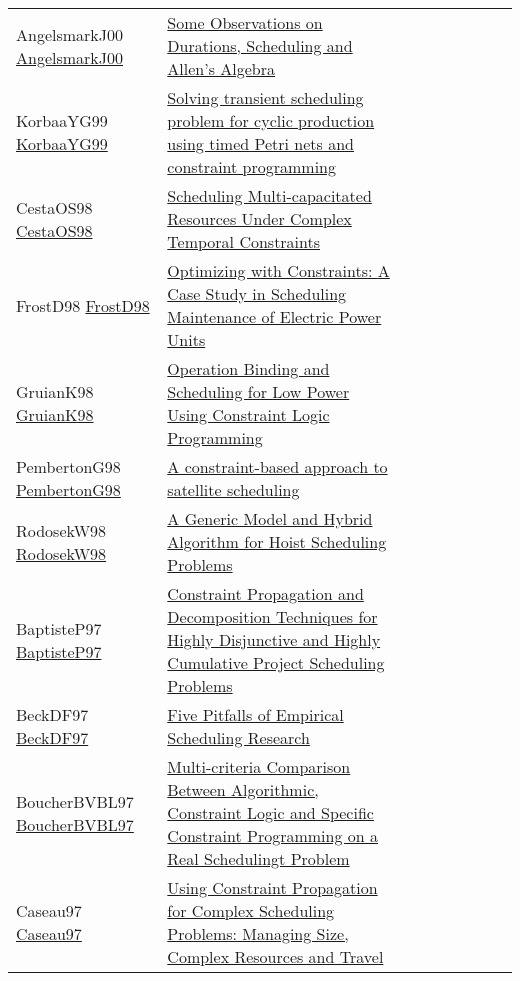 {\begin{longtable}{p{3cm}p{7cm}lllllll}
AngelsmarkJ00 \href{https://doi.org/10.1007/3-540-45349-0\_35}{AngelsmarkJ00} &  \href{papers/AngelsmarkJ00.pdf}{Some Observations on Durations, Scheduling and Allen's Algebra} &  &  &  &  &  &  & \\
KorbaaYG99 \href{https://doi.org/10.23919/ECC.1999.7099947}{KorbaaYG99} &  \href{papers/KorbaaYG99.pdf}{Solving transient scheduling problem for cyclic production using timed Petri nets and constraint programming} &  &  &  &  &  &  & \\
CestaOS98 \href{https://doi.org/10.1007/3-540-49481-2\_36}{CestaOS98} &  \href{papers/CestaOS98.pdf}{Scheduling Multi-capacitated Resources Under Complex Temporal Constraints} &  &  &  &  &  &  & \\
FrostD98 \href{https://doi.org/10.1007/3-540-49481-2\_40}{FrostD98} &  \href{papers/FrostD98.pdf}{Optimizing with Constraints: {A} Case Study in Scheduling Maintenance of Electric Power Units} &  &  &  &  &  &  & \\
GruianK98 \href{https://doi.org/10.1109/EURMIC.1998.711781}{GruianK98} &  \href{papers/GruianK98.pdf}{Operation Binding and Scheduling for Low Power Using Constraint Logic Programming} &  &  &  &  &  &  & \\
PembertonG98 \href{https://doi.org/10.1090/dimacs/057/06}{PembertonG98} &  \href{}{A constraint-based approach to satellite scheduling} &  &  &  &  &  &  & \\
RodosekW98 \href{https://doi.org/10.1007/3-540-49481-2\_28}{RodosekW98} &  \href{papers/RodosekW98.pdf}{A Generic Model and Hybrid Algorithm for Hoist Scheduling Problems} &  &  &  &  &  &  & \\
BaptisteP97 \href{https://doi.org/10.1007/BFb0017454}{BaptisteP97} &  \href{papers/BaptisteP97.pdf}{Constraint Propagation and Decomposition Techniques for Highly Disjunctive and Highly Cumulative Project Scheduling Problems} &  &  &  &  &  &  & \\
BeckDF97 \href{https://doi.org/10.1007/BFb0017455}{BeckDF97} &  \href{papers/BeckDF97.pdf}{Five Pitfalls of Empirical Scheduling Research} &  &  &  &  &  &  & \\
BoucherBVBL97 \href{}{BoucherBVBL97} &  \href{}{Multi-criteria Comparison Between Algorithmic, Constraint Logic and Specific Constraint Programming on a Real Schedulingt Problem} &  &  &  &  &  &  & \\
Caseau97 \href{https://doi.org/10.1007/BFb0017437}{Caseau97} &  \href{papers/Caseau97.pdf}{Using Constraint Propagation for Complex Scheduling Problems: Managing Size, Complex Resources and Travel} &  &  &  &  &  &  & \\

\end{longtable}}
